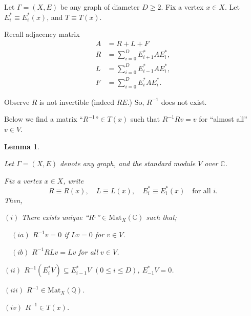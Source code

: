 \documentclass[
]{book}
\newtheorem{lemma}{Lemma}[chapter]
\theoremstyle{definition}
\theoremstyle{definition}
\theoremstyle{definition}
\theoremstyle{definition}
\theoremstyle{remark}
\begin{document}
Let \(\Gamma = (X, E)\) be any graph of diameter \(D\geq 2\). Fix a vertex \(x\in X\). Let \(E^*_i\equiv E^*_i(x)\), and \(T \equiv T(x)\).

Recall adjacency matrix
\begin{align}
A & = R + L + F\\
R & = \sum_{i=0}^D E^*_{i+1}AE^*_i,\\
L & = \sum_{i=0}^D E^*_{i-1}AE^*_i,\\
F & = \sum_{i=0}^D E^*_{i}AE^*_i.
\end{align}

Observe \(R\) is not invertible (indeed \(RE%
\).)
So, \(R^{-1}\) does not exist.

Below we find a matrix ``\(R^{-1}\)''\(\in T(x)\) such that \(R^{-1}Rv = v\) for ``almost all'' \(v\in V\).

\begin{lemma}
\protect\hypertarget{lem:inverse-of-r}{}\label{lem:inverse-of-r}

Let \(\Gamma = (X, E)\) denote any graph, and the standard module \(V\) over \(\mathbb{C}\).

Fix a vertex \(x\in X\), write
\[R\equiv R(x), \quad L \equiv L(x), \quad E^*_i\equiv E^*_i(x) \quad \text{for all }i.\]
Then,

\((i)\) There exists unique ``\(R^{_1}\)''\(\in \mathrm{Mat}_X(\mathbb{C})\) such that;

\(\quad (ia)\) \(R^{-1}v = 0\) if \(Lv = 0\) for \(v\in V\).

\(\quad (ib)\) \(R^{-1}RLv = Lv\) for all \(v\in V\).

\((ii)\) \(R^{-1}(E^*_iV)\subseteq E^*_{i-1}V\) \((0\leq i\leq D)\), \(E^*_{-1}V = 0\).

\((iii)\) \(R^{-1}\in \mathrm{Mat}_X(\mathbb{Q})\).

\((iv)\) \(R^{-1}\in T(x)\).

\end{lemma}
\end{document}
